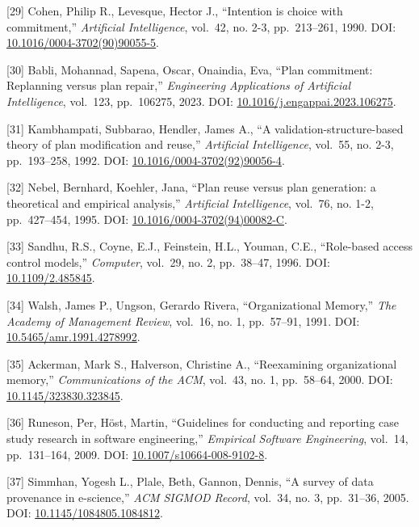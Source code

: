 \documentclass[
]{article}
\begin{document}
{[}29{]} Cohen, Philip R., Levesque, Hector J., ``Intention is choice
with commitment,'' \emph{Artificial Intelligence}, vol.~42, no. 2-3,
pp.~213--261, 1990. DOI:
\href{https://doi.org/10.1016/0004-3702(90)90055-5}{10.1016/0004-3702(90)90055-5}.

{[}30{]} Babli, Mohannad, Sapena, \textquotesingle Oscar, Onaindia, Eva,
``Plan commitment: Replanning versus plan repair,'' \emph{Engineering
Applications of Artificial Intelligence}, vol.~123, pp.~106275, 2023.
DOI:
\href{https://doi.org/10.1016/j.engappai.2023.106275}{10.1016/j.engappai.2023.106275}.

{[}31{]} Kambhampati, Subbarao, Hendler, James A., ``A
validation-structure-based theory of plan modification and reuse,''
\emph{Artificial Intelligence}, vol.~55, no. 2-3, pp.~193--258, 1992.
DOI:
\href{https://doi.org/10.1016/0004-3702(92)90056-4}{10.1016/0004-3702(92)90056-4}.

{[}32{]} Nebel, Bernhard, Koehler, Jana, ``Plan reuse versus plan
generation: a theoretical and empirical analysis,'' \emph{Artificial
Intelligence}, vol.~76, no. 1-2, pp.~427--454, 1995. DOI:
\href{https://doi.org/10.1016/0004-3702(94)00082-C}{10.1016/0004-3702(94)00082-C}.

{[}33{]} Sandhu, R.S., Coyne, E.J., Feinstein, H.L., Youman, C.E.,
``Role-based access control models,'' \emph{Computer}, vol.~29, no. 2,
pp.~38--47, 1996. DOI:
\href{https://doi.org/10.1109/2.485845}{10.1109/2.485845}.

{[}34{]} Walsh, James P., Ungson, Gerardo Rivera, ``Organizational
Memory,'' \emph{The Academy of Management Review}, vol.~16, no. 1,
pp.~57--91, 1991. DOI:
\href{https://doi.org/10.5465/amr.1991.4278992}{10.5465/amr.1991.4278992}.

{[}35{]} Ackerman, Mark S., Halverson, Christine A., ``Reexamining
organizational memory,'' \emph{Communications of the ACM}, vol.~43, no.
1, pp.~58--64, 2000. DOI:
\href{https://doi.org/10.1145/323830.323845}{10.1145/323830.323845}.

{[}36{]} Runeson, Per, Höst, Martin, ``Guidelines for conducting and
reporting case study research in software engineering,'' \emph{Empirical
Software Engineering}, vol.~14, pp.~131--164, 2009. DOI:
\href{https://doi.org/10.1007/s10664-008-9102-8}{10.1007/s10664-008-9102-8}.

{[}37{]} Simmhan, Yogesh L., Plale, Beth, Gannon, Dennis, ``A survey of
data provenance in e-science,'' \emph{ACM SIGMOD Record}, vol.~34, no.
3, pp.~31--36, 2005. DOI:
\href{https://doi.org/10.1145/1084805.1084812}{10.1145/1084805.1084812}.
\end{document}
